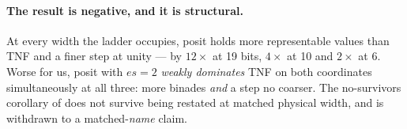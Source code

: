 \begin{table}[t]\centering\footnotesize 
\caption{Every rung against posit at its own \emph{physical} width, computed
from the committed reference implementations rather than quoted. ``Values'' counts
distinct non-zero decodings; ``step at $1.0$'' is the local relative gap between
neighbours, which bounds the rounding error in the working range.}
\label{tab:matchedwidth}
\end{table}

\paragraph{The result is negative, and it is structural.} At every width the
ladder occupies, posit holds more representable values than TNF and a finer step
at unity --- by $12\times$ at 19 bits, $4\times$ at 10 and $2\times$ at 6. Worse
for us, posit with $es{=}2$ \emph{weakly dominates} TNF on both coordinates
simultaneously at all three: more binades \emph{and} a step no coarser. The
no-survivors corollary of  does not survive being
restated at matched physical width, and is withdrawn to a matched-\emph{name}
claim.

